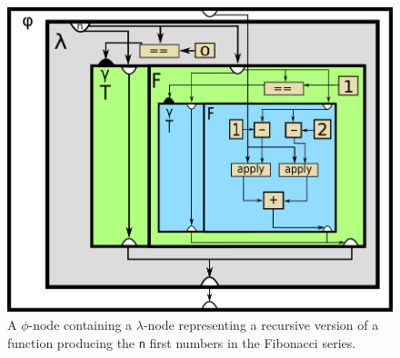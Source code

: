 \begin{figure}[h!]
	\centering
	\includegraphics[width=\textwidth]{figures/recursive_fibonacci}
	\caption{A $\phi$-node containing a $\lambda$-node representing a recursive
version of a function producing the \lstinline!n! first numbers in the Fibonacci
series.}
	\label{fig:fib_phi}
\end{figure}
